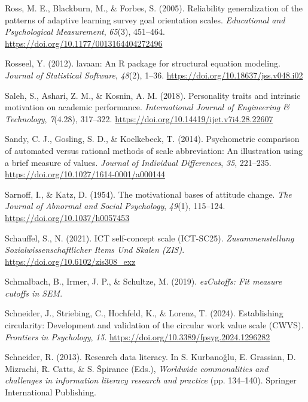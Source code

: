 \documentclass[
  12pt,
  a4paper,
  twoside]{article}
\newlength{\cslhangindent}
\newenvironment{CSLReferences}[2] %
 {\begin{list}{}{%
  \setlength{\itemindent}{0pt}
  \setlength{\leftmargin}{0pt}
  \setlength{\parsep}{0pt}
  \ifodd #1
   \setlength{\leftmargin}{\cslhangindent}
   \setlength{\itemindent}{-1\cslhangindent}
  \fi
  \setlength{\itemsep}{#2\baselineskip}}}
 {\end{list}}
\begin{document}
\begin{CSLReferences}{1}{0}
Ross, M. E., Blackburn, M., \& Forbes, S. (2005). Reliability generalization of the patterns of adaptive learning survey goal orientation scales. \emph{Educational and Psychological Measurement}, \emph{65}(3), 451--464. \url{https://doi.org/10.1177/0013164404272496}

Rosseel, Y. (2012). {lavaan}: An {R} package for structural equation modeling. \emph{Journal of Statistical Software}, \emph{48}(2), 1--36. \url{https://doi.org/10.18637/jss.v048.i02}

Saleh, S., Ashari, Z. M., \& Kosnin, A. M. (2018). Personality traits and intrinsic motivation on academic performance. \emph{International Journal of Engineering \& Technology}, \emph{7}(4.28), 317--322. \url{https://doi.org/10.14419/ijet.v7i4.28.22607}

Sandy, C. J., Gosling, S. D., \& Koelkebeck, T. (2014). Psychometric comparison of automated versus rational methods of scale abbreviation: An illustration using a brief measure of values. \emph{Journal of Individual Differences}, \emph{35}, 221--235. \url{https://doi.org/10.1027/1614-0001/a000144}

Sarnoff, I., \& Katz, D. (1954). The motivational bases of attitude change. \emph{The Journal of Abnormal and Social Psychology}, \emph{49}(1), 115--124. \url{https://doi.org/10.1037/h0057453}

Schauffel, S., N. (2021). ICT self-concept scale (ICT-SC25). \emph{Zusammenstellung Sozialwissenschaftlicher Items Und Skalen (ZIS)}. \url{https://doi.org/10.6102/zis308_exz}

Schmalbach, B., Irmer, J. P., \& Schultze, M. (2019). \emph{ezCutoffs: Fit measure cutoffs in SEM}.

Schneider, J., Striebing, C., Hochfeld, K., \& Lorenz, T. (2024). Establishing circularity: Development and validation of the circular work value scale (CWVS). \emph{Frontiers in Psychology}, \emph{15}. \url{https://doi.org/10.3389/fpsyg.2024.1296282}

Schneider, R. (2013). Research data literacy. In S. Kurbanoğlu, E. Grassian, D. Mizrachi, R. Catts, \& S. Špiranec (Eds.), \emph{Worldwide commonalities and challenges in information literacy research and practice} (pp. 134--140). Springer International Publishing.


\end{CSLReferences}
\end{document}
